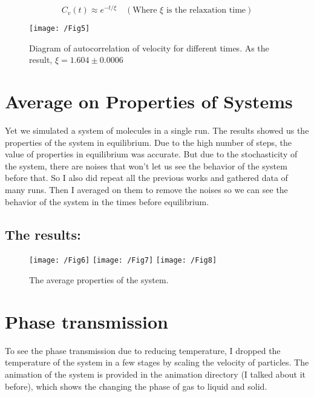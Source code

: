 \documentclass{article}
\begin{document}
    $$
    C_v(t) \approx e^{-t/\xi}\quad (\text{Where $\xi$ is the relaxation time})
    $$

    \begin{figure}[!htb]
        \centering
        \texttt{[image: /Fig5]}
        \label{fig.5}
        \caption{Diagram of autocorrelation of velocity for different times. As the result, $\xi = 1.604 \pm 0.0006$}
    \end{figure}

    \section*{Average on Properties of Systems}

    Yet we simulated a system of molecules in a single run.
    The results showed us the properties of the system in equilibrium.
    Due to the high number of steps, the value of properties in equilibrium was accurate.
    But due to the stochasticity of the system, there are noises that won't let us see the behavior of the system before that.
    So I also did repeat all the previous works and gathered data of many runs.
    Then I averaged on them to remove the noises so we can see the behavior of the system in the times before equilibrium.

    \subsection*{The results:}

    \begin{figure}[!htb]
        \centering
        \texttt{[image: /Fig6]}
        \label{fig.6}
        \texttt{[image: /Fig7]}
        \label{fig.7}
        \texttt{[image: /Fig8]}
        \label{fig.8}
        \caption{The average properties of the system.}
    \end{figure}

    \section*{Phase transmission}

    To see the phase transmission due to reducing temperature,
    I dropped the temperature of the system in a few stages by scaling the velocity of particles.
    The animation of the system is provided in the animation directory (I talked about it before),
    which shows the changing the phase of gas to liquid and solid.
\end{document}
